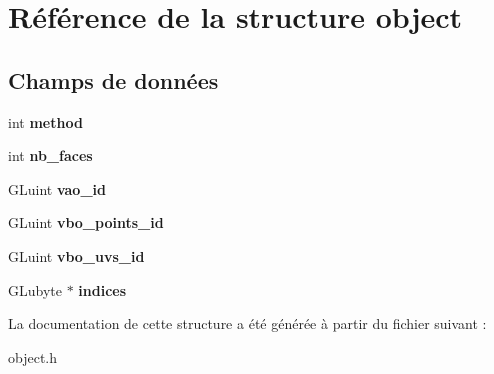 \hypertarget{structobject}{\section{Référence de la structure object}
\label{structobject}
}
\subsection*{Champs de données}
\begin{DoxyCompactItemize}
\item 
\hypertarget{structobject_adcc9a19ad3119f823a658f6a49a24e64}{int {\bfseries method}}\label{structobject_adcc9a19ad3119f823a658f6a49a24e64}

\item 
\hypertarget{structobject_abf159625f65beb62a2c71c35069304e6}{int {\bfseries nb\-\_\-faces}}\label{structobject_abf159625f65beb62a2c71c35069304e6}

\item 
\hypertarget{structobject_ac97430dc005f065ac234be1f8ad0dcad}{G\-Luint {\bfseries vao\-\_\-id}}\label{structobject_ac97430dc005f065ac234be1f8ad0dcad}

\item 
\hypertarget{structobject_a170db75958ee90d69545c04af594422a}{G\-Luint {\bfseries vbo\-\_\-points\-\_\-id}}\label{structobject_a170db75958ee90d69545c04af594422a}

\item 
\hypertarget{structobject_a85642c42e8807ca186a08947b38dda14}{G\-Luint {\bfseries vbo\-\_\-uvs\-\_\-id}}\label{structobject_a85642c42e8807ca186a08947b38dda14}

\item 
\hypertarget{structobject_a8a89103d8852f3e3c8f15eed6208fc70}{G\-Lubyte $\ast$ {\bfseries indices}}\label{structobject_a8a89103d8852f3e3c8f15eed6208fc70}

\end{DoxyCompactItemize}


La documentation de cette structure a été générée à partir du fichier suivant \-:\begin{DoxyCompactItemize}
\item 
object.\-h\end{DoxyCompactItemize}
